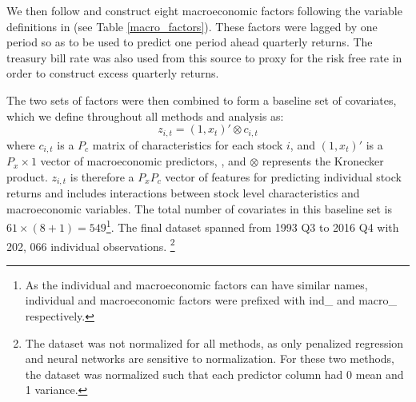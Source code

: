 \documentclass{article}
\begin{document}

We then follow \cite{gu_empirical_2018} and construct eight macroeconomic factors following the variable definitions in \cite{welch_comprehensive_2008} (see Table \ref{macro_factors}). These factors were lagged by one period so as to be used to predict one period ahead quarterly returns. The treasury bill rate was also used from this source to proxy for the risk free rate in order to construct excess quarterly returns. 

The two sets of factors were then combined to form a baseline set of covariates, which we define throughout all methods and analysis as:
\begin{equation}
z_{i,t} = (1, x_t)' \otimes c_{i, t}
\end{equation}
where $c_{i,t}$ is a $P_c$ matrix of characteristics for each stock $i$, and $(1, x_t)'$ is a $P_x \times 1$ vector of macroeconomic predictors, , and $\otimes$ represents the Kronecker product. $z_{i,t}$ is therefore a $P_x P_c$ vector of features for predicting individual stock returns and includes interactions between stock level characteristics and macroeconomic variables. The total number of covariates in this baseline set is $61 \times (8 + 1) = 549$\footnote{As the individual and macroeconomic factors can have similar names, individual and macroeconomic factors were prefixed with ind\_ and macro\_ respectively.}. The final dataset spanned from 1993 Q3 to 2016 Q4 with 202, 066 individual observations. \footnote{The dataset was not normalized for all methods, as only penalized regression and neural networks are sensitive to normalization. For these two methods, the dataset was normalized such that each predictor column had 0 mean and 1 variance.}
\end{document}
